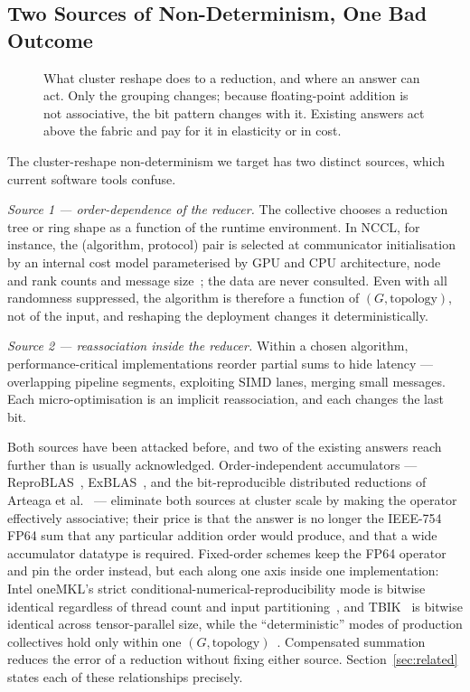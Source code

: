 \documentclass[journal,10pt]{IEEEtran}
\theoremstyle{plain}
\theoremstyle{definition}
\theoremstyle{remark}
\begin{document}
\subsection{Two Sources of Non-Determinism, One Bad Outcome}

\begin{figure}[!t]\centering

\caption{What cluster reshape does to a reduction, and where an answer can act. Only the grouping changes; because floating-point addition is not associative, the bit pattern changes with it. Existing answers act above the fabric and pay for it in elasticity or in cost.}\label{fig:reshape}
\end{figure}


The cluster-reshape non-determinism we target has two distinct sources,
which current software tools confuse.

\emph{Source 1 --- order-dependence of the reducer.} The collective chooses
a reduction tree or ring shape as a function of the runtime environment. In
NCCL, for instance, the (algorithm, protocol) pair is selected at
communicator initialisation by an internal cost model parameterised by GPU
and CPU architecture, node and rank counts and message
size~\cite{nccl2018}; the data are never consulted. Even with all
randomness suppressed, the algorithm is therefore a function of
$(G,\text{topology})$, not of the input, and reshaping the deployment
changes it deterministically.

\emph{Source 2 --- reassociation inside the reducer.} Within a chosen
algorithm, performance-critical implementations reorder partial sums to
hide latency --- overlapping pipeline segments, exploiting SIMD
lanes, merging small messages. Each micro-optimisation
is an implicit reassociation, and each changes the last bit.

Both sources have been attacked before, and two of the existing answers
reach further than is usually acknowledged. Order-independent accumulators
--- ReproBLAS~\cite{demmel2013reproBLAS}, ExBLAS~\cite{iakymchuk2016exblas},
and the bit-reproducible distributed reductions of Arteaga et
al.~\cite{arteaga2014bitreproducible} --- eliminate both sources at cluster
scale by making the operator effectively associative; their price is that
the answer is no longer the IEEE-754 FP64 sum that any particular addition
order would produce, and that a wide accumulator datatype is required.
Fixed-order schemes keep the FP64 operator and pin the order instead, but
each along one axis inside one implementation: Intel oneMKL's strict
conditional-numerical-reproducibility mode is bitwise identical regardless of
thread count and input partitioning~\cite{onemkl_cnr}, and
TBIK~\cite{tbik2025} is bitwise identical across tensor-parallel size, while
the ``deterministic'' modes of production collectives hold only within one
$(G,\text{topology})$~\cite{nccl2018,rccl2019}. Compensated
summation~\cite{kahan1965summation,rump2009accurate} reduces the error of a
reduction without fixing either source. Section~\ref{sec:related} states each
of these relationships precisely.
\end{document}

